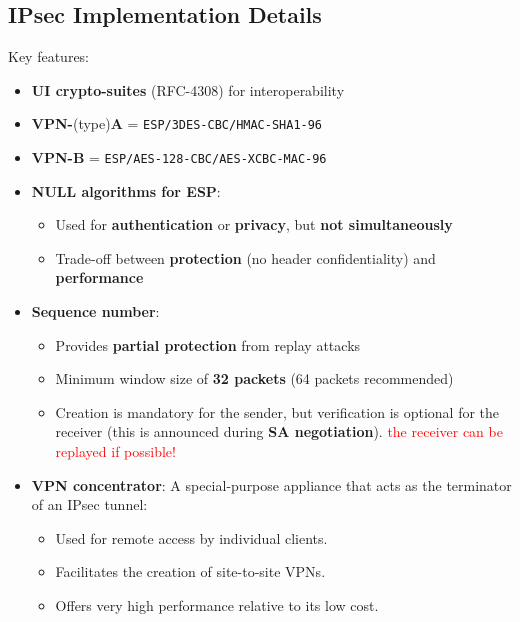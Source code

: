 \subsection{IPsec Implementation Details}
Key features:
\begin{itemize}
    \item \textbf{UI crypto-suites} (RFC-4308) for interoperability
    \item \textbf{VPN-}(type)\textbf{A} = \texttt{ESP/3DES-CBC/HMAC-SHA1-96}
    \item \textbf{VPN-B} = \texttt{ESP/AES-128-CBC/AES-XCBC-MAC-96}
    \item \textbf{NULL algorithms for ESP}:
    \begin{itemize}
        \item Used for \textbf{authentication} or \textbf{privacy}, but \textbf{not simultaneously}
        \item Trade-off between \textbf{protection} (no header confidentiality) and \textbf{performance}
    \end{itemize}
    \item \textbf{Sequence number}:
    \begin{itemize}
        \item Provides \textbf{partial protection} from replay attacks
        \item Minimum window size of \textbf{32 packets} (64 packets recommended)
        \item Creation is mandatory for the sender, but verification is optional for the receiver (this is announced during \textbf{SA negotiation}). \textcolor{red}{the receiver can be replayed if possible!}
    \end{itemize}
    \item \textbf{VPN concentrator}: A special-purpose appliance that acts as the terminator of an IPsec tunnel:
    \begin{itemize}
        \item Used for remote access by individual clients.
        \item Facilitates the creation of site-to-site VPNs.
        \item Offers very high performance relative to its low cost.
    \end{itemize}
\end{itemize}



